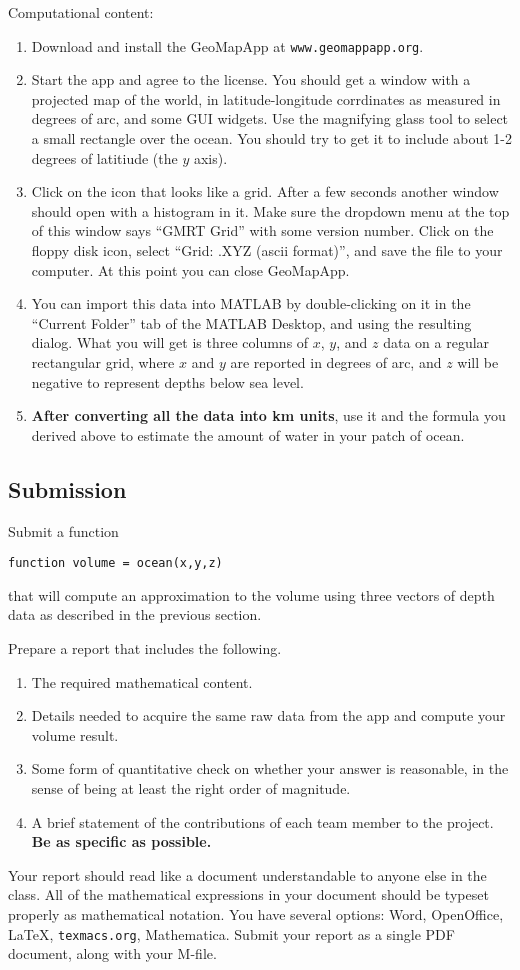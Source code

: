 \documentclass[11pt,twoside]{article}
\begin{document}
Computational content:
\begin{enumerate}
\item Download and install the GeoMapApp at \texttt{www.geomappapp.org}. 
\item Start the app and agree to the license. You should get a window with a projected map of the world, in latitude-longitude corrdinates as measured in degrees of arc, and some GUI widgets. Use the magnifying glass tool to select a small rectangle over the ocean. You should try to get it to include about 1-2 degrees of latitiude (the $y$ axis). 
\item Click on the icon that looks like a grid. After a few seconds another window should open with a histogram in it. Make sure the dropdown menu at the top of this window says ``GMRT Grid'' with some version number. Click on the floppy disk icon, select ``Grid: .XYZ (ascii format)'', and save the file to your computer. At this point you can close GeoMapApp. 
\item You can import this data into MATLAB by double-clicking on it in the ``Current Folder'' tab of the MATLAB Desktop, and using the resulting dialog. What you will get is three columns of $x$, $y$, and $z$ data on a regular rectangular grid, where $x$ and $y$ are reported in degrees of arc, and $z$ will be negative to represent depths below sea level.
\item \textbf{After converting all the data into km units}, use it and the formula you derived above to estimate the amount of water in your patch of ocean.
\end{enumerate}


\subsection*{Submission}

Submit a function 
\begin{verbatim}
function volume = ocean(x,y,z)
\end{verbatim}
that will compute an approximation to the volume using three vectors of depth data as described in the previous section.

Prepare a report that includes the following.
\begin{enumerate}
\item The required mathematical content. 
\item Details needed to acquire the same raw data from the app and compute your volume result.
\item Some form of quantitative check on whether your answer is reasonable, in the sense of being at least the right order of magnitude. 
\item A brief statement of the contributions of each team member to the project. \textbf{Be as specific as possible.}
\end{enumerate}
Your report should read like a document understandable to anyone else in the class. All of the mathematical expressions in your document should be typeset properly as mathematical notation. You have several options: Word, OpenOffice, \LaTeX, \texttt{texmacs.org}, Mathematica. Submit your report as a single PDF document, along with your M-file. 
\end{document}
